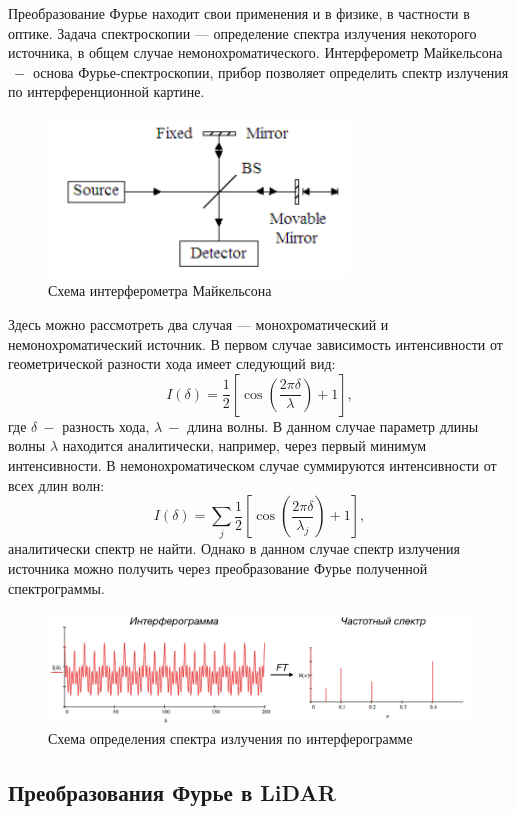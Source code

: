 Преобразование Фурье находит свои применения и в физике, в частности в оптике. Задача спектроскопии — определение спектра излучения некоторого источника, в общем случае немонохроматического.
Интерферометр Майкельсона $~-$ основа Фурье-спектроскопии, прибор позволяет определить спектр излучения по интерференционной картине.
\begin{figure}[!htb]
\centering
\includegraphics[width=8cm]{chapters/grigorev_s1/pictures/interferometer}%
\caption{Схема интерферометра Майкельсона}
\end{figure}
Здесь можно рассмотреть два случая — монохроматический и немонохроматический источник. В первом случае зависимость интенсивности от геометрической разности хода имеет следующий вид:
$$I(\delta) = \frac{1}{2} \left[ \cos\left( \frac{2 \pi \delta}{\lambda} \right) + 1 \right],$$ 
где $\delta ~-$ разность хода, $\lambda ~- $ длина волны. В данном случае параметр длины волны $\lambda$ находится аналитически, например, через первый минимум интенсивности.
В немонохроматическом случае суммируются интенсивности от всех длин волн:
$$I(\delta) = \sum \limits _j \frac{1}{2} \left[ \cos\left( \frac{2 \pi \delta}{\lambda_j} \right) + 1 \right],$$ 
аналитически спектр не найти. Однако в данном случае спектр излучения источника можно получить через преобразование Фурье полученной спектрограммы. 
\begin{figure}[!htb]
\centering
\includegraphics[width=14cm]{chapters/grigorev_s1/pictures/interferogram_spectrum}
\caption{Схема определения спектра излучения по интерферограмме}
\end{figure}

\subsection{Преобразования Фурье в LiDAR}


